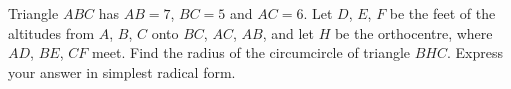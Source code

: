 Triangle $ABC$ has $AB=7$, $BC=5$ and $AC=6$. Let $D$, $E$, $F$ be the feet of the altitudes from $A$, $B$, $C$ onto $BC$, $AC$, $AB$, and let $H$ be the orthocentre, where $AD$, $BE$, $CF$ meet. Find the radius of the circumcircle of triangle $BHC$. Express your answer in simplest radical form.
